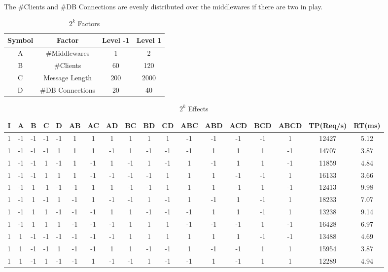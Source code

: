 \documentclass[11pt]{article}
\begin{document}
The \#Clients and \#DB Connections are evenly distributed over the middlewares if there are two in play.
\begin{landscape}
\begin{table}
\small
\centering
\caption{$2^k$ Factors}
\label{tbl:2k_labels}
\begin{tabular}{cccc}
	Symbol & Factor & Level -1 & Level 1 \\ \hline
	A & \#Middlewares & 1 & 2 \\
	B & \#Clients & 60 & 120 \\
	C & Message Length & 200 & 2000 \\
	D & \#DB Connections & 20 & 40 \\ \hline
\end{tabular}
\end{table}
\begin{table}[]
	\small
	\centering
	\caption{$2^k$ Effects}
	\label{tbl:2k}
	\begin{tabular}{|cccccccccccccccc|cc|}
		\hline
		I & A & B & C & D & AB & AC & AD & BC & BD & CD & ABC & ABD & ACD & BCD & ABCD & TP(Req/s) & RT(ms)\\ \hline
		1 & -1 & -1 & -1 & -1 & 1 & 1 & 1 & 1 & 1 & 1 & -1 & -1 & -1 & -1 & 1 & 12427 & 5.12\\
		1 & -1 & -1 & -1 & 1 & 1 & 1 & -1 & 1 & -1 & -1 & -1 & 1 & 1 & 1 & -1 & 14707 & 3.87 \\
		1 & -1 & -1 & 1 & -1 & 1 & -1 & 1 & -1 & 1 & -1 & 1 & -1 & 1 & 1 & -1 & 11859 & 4.84 \\
		1 & -1 & -1 & 1 & 1 & 1 & -1 & -1 & -1 & -1 & 1 & 1 & 1 & -1 & -1 & 1 & 16133 & 3.66 \\
		1 & -1 & 1 & -1 & -1 & -1 & 1 & 1 & -1 & -1 & 1 & 1 & 1 & -1 & 1 & -1 & 12413 & 9.98 \\
		1 & -1 & 1 & -1 & 1 & -1 & 1 & -1 & -1 & 1 & -1 & 1 & -1 & 1 & -1 & 1 & 18233 & 7.07 \\
		1 & -1 & 1 & 1 & -1 & -1 & -1 & 1 & 1 & -1 & -1 & -1 & 1 & 1 & -1 & 1 & 13238 & 9.14 \\
		1 & -1 & 1 & 1 & 1 & -1 & -1 & -1 & 1 & 1 & 1 & -1 & -1 & -1 & 1 & -1 & 16428 & 6.97 \\
		1 & 1 & -1 & -1 & -1 & -1 & -1 & -1 & 1 & 1 & 1 & 1 & 1 & 1 & -1 & -1 & 13488 & 4.69 \\
		1 & 1 & -1 & -1 & 1 & -1 & -1 & 1 & 1 & -1 & -1 & 1 & -1 & -1 & 1 & 1 & 15954 & 3.87 \\
		1 & 1 & -1 & 1 & -1 & -1 & 1 & -1 & -1 & 1 & -1 & -1 & 1 & -1 & 1 & 1 & 12289 & 4.94 \\

\end{tabular}
\end{table}
\end{landscape}
\end{document}
